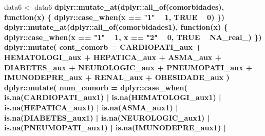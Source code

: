 \documentclass[
]{article}
\newenvironment{Shaded}{\begin{snugshade}}{\end{snugshade}}
\newcommand{\ControlFlowTok}[1]{\textcolor[rgb]{0.13,0.29,0.53}{\textbf{#1}}}
\newcommand{\DataTypeTok}[1]{\textcolor[rgb]{0.13,0.29,0.53}{#1}}
\newcommand{\DecValTok}[1]{\textcolor[rgb]{0.00,0.00,0.81}{#1}}
\newcommand{\KeywordTok}[1]{\textcolor[rgb]{0.13,0.29,0.53}{\textbf{#1}}}
\newcommand{\NormalTok}[1]{#1}
\newcommand{\OperatorTok}[1]{\textcolor[rgb]{0.81,0.36,0.00}{\textbf{#1}}}
\newcommand{\OtherTok}[1]{\textcolor[rgb]{0.56,0.35,0.01}{#1}}
\newcommand{\StringTok}[1]{\textcolor[rgb]{0.31,0.60,0.02}{#1}}
\begin{document}
\begin{Shaded}
\begin{Highlighting}[]
\NormalTok{data6 <-}\StringTok{  }\NormalTok{data6 }\OperatorTok{%>%}
\StringTok{  }\NormalTok{dplyr}\OperatorTok{::}\KeywordTok{mutate_at}\NormalTok{(dplyr}\OperatorTok{::}\KeywordTok{all_of}\NormalTok{(comorbidades), }\ControlFlowTok{function}\NormalTok{(x) \{}
\NormalTok{    dplyr}\OperatorTok{::}\KeywordTok{case_when}\NormalTok{(x }\OperatorTok{==}\StringTok{ "1"} \OperatorTok{~}\StringTok{ }\DecValTok{1}\NormalTok{, }\OtherTok{TRUE} \OperatorTok{~}\StringTok{ }\DecValTok{0}\NormalTok{)}
\NormalTok{  \}) }\OperatorTok{%>%}
\StringTok{  }\NormalTok{dplyr}\OperatorTok{::}\KeywordTok{mutate_at}\NormalTok{(dplyr}\OperatorTok{::}\KeywordTok{all_of}\NormalTok{(comorbidades1), }\ControlFlowTok{function}\NormalTok{(x) \{}
\NormalTok{    dplyr}\OperatorTok{::}\KeywordTok{case_when}\NormalTok{(x }\OperatorTok{==}\StringTok{ "1"} \OperatorTok{~}\StringTok{ }\DecValTok{1}\NormalTok{, x }\OperatorTok{==}\StringTok{ "2"} \OperatorTok{~}\StringTok{ }\DecValTok{0}\NormalTok{, }\OtherTok{TRUE} \OperatorTok{~}\StringTok{ }\OtherTok{NA_real_}\NormalTok{)}
\NormalTok{  \}) }\OperatorTok{%>%}
\StringTok{  }\NormalTok{dplyr}\OperatorTok{::}\KeywordTok{mutate}\NormalTok{(}
    \DataTypeTok{cont_comorb =}\NormalTok{ CARDIOPATI_aux }\OperatorTok{+}\StringTok{ }\NormalTok{HEMATOLOGI_aux }\OperatorTok{+}\StringTok{  }\NormalTok{HEPATICA_aux }\OperatorTok{+}\StringTok{ }\NormalTok{ASMA_aux }\OperatorTok{+}\StringTok{ }
\StringTok{      }\NormalTok{DIABETES_aux }\OperatorTok{+}\StringTok{ }\NormalTok{NEUROLOGIC_aux }\OperatorTok{+}\StringTok{ }\NormalTok{PNEUMOPATI_aux }\OperatorTok{+}\StringTok{ }\NormalTok{IMUNODEPRE_aux }\OperatorTok{+}\StringTok{ }
\StringTok{      }\NormalTok{RENAL_aux }\OperatorTok{+}\StringTok{ }\NormalTok{OBESIDADE_aux}
\NormalTok{  ) }\OperatorTok{%>%}\StringTok{ }
\StringTok{  }\NormalTok{dplyr}\OperatorTok{::}\KeywordTok{mutate}\NormalTok{(}
    \DataTypeTok{num_comorb =}\NormalTok{ dplyr}\OperatorTok{::}\KeywordTok{case_when}\NormalTok{(}
      \KeywordTok{is.na}\NormalTok{(CARDIOPATI_aux1) }\OperatorTok{|}
\StringTok{        }\KeywordTok{is.na}\NormalTok{(HEMATOLOGI_aux1) }\OperatorTok{|}
\StringTok{        }\KeywordTok{is.na}\NormalTok{(HEPATICA_aux1) }\OperatorTok{|}
\StringTok{        }\KeywordTok{is.na}\NormalTok{(ASMA_aux1) }\OperatorTok{|}
\StringTok{        }\KeywordTok{is.na}\NormalTok{(DIABETES_aux1) }\OperatorTok{|}
\StringTok{        }\KeywordTok{is.na}\NormalTok{(NEUROLOGIC_aux1) }\OperatorTok{|}\StringTok{ }\KeywordTok{is.na}\NormalTok{(PNEUMOPATI_aux1) }\OperatorTok{|}
\StringTok{        }\KeywordTok{is.na}\NormalTok{(IMUNODEPRE_aux1) }\OperatorTok{|}
}}}}
\end{Highlighting}
\end{Shaded}
\end{document}
